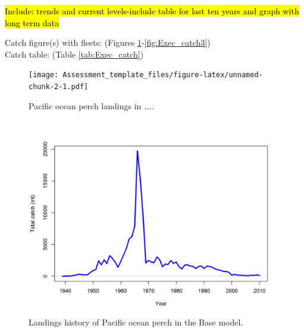 \documentclass[12pt,]{article}
\begin{document}
\hl{Include: trends and current levels-include table for last ten years and graph with 
long term data}

Catch figure(s) with fleets: (Figures
\ref{fig:Exec_catch1}-\ref{fig:Exec_catch3})\\
Catch table: (Table \ref{tab:Exec_catch})

\FloatBarrier

\begin{figure}
\centering
\texttt{[image: Assessment\_template\_files/figure-latex/unnamed-chunk-2-1.pdf]}
\caption{Pacific ocean perch landings in \ldots{}..
\label{fig:Exec_catch1}}
\end{figure}

\FloatBarrier

\begin{figure}
\centering
\includegraphics{r4ss/plots_mod1/catch2 landings stacked.png}
\caption{Landings history of Pacific ocean perch in the Base model.
\label{fig:r4ss_catches}}
\end{figure}
\end{document}

